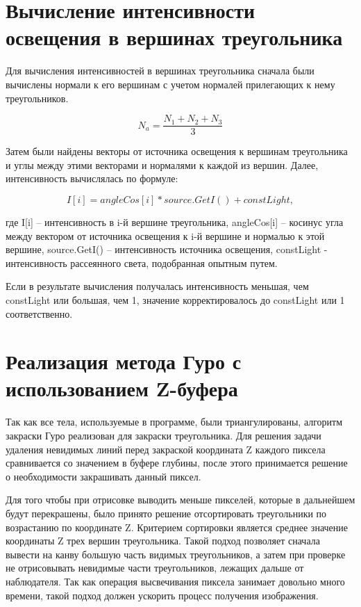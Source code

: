 \section{Вычисление интенсивности освещения в вершинах треугольника}
Для вычисления интенсивностей в вершинах треугольника сначала были вычислены нормали к его вершинам с учетом нормалей прилегающих к нему треугольников.
\begin{figure}[ht!]
\end{figure}

\begin{equation}
	N_a = \frac{N_1 + N_2 + N_3}{3}
\end{equation}

Затем были найдены векторы от источника освещения к вершинам треугольника и углы между этими векторами и нормалями к каждой из вершин. 
Далее, интенсивность вычислялась по формуле:

\begin{equation}
	I[i] = angleCos[i] * source.GetI() + constLight ,
\end{equation}

где I[i] – интенсивность в i-й вершине треугольника, angleCos[i] – косинус угла между вектором от источника освещения к i-й вершине и нормалью к этой вершине, source.GetI() – интенсивность источника освещения, constLight - интенсивность рассеянного света, подобранная опытным путем.

Если в результате вычисления получалась интенсивность меньшая, чем constLight или большая, чем 1, значение корректировалось до constLight или 1 соответственно.




\section{Реализация метода Гуро с использованием Z-буфера}

Так как все тела, используемые в программе, были триангулированы, алгоритм закраски Гуро реализован для закраски треугольника. Для решения задачи удаления невидимых линий перед закраской координата Z каждого пиксела сравнивается со значением в буфере глубины, после этого принимается решение о необходимости закрашивать данный пиксел.

Для того чтобы при отрисовке выводить меньше пикселей, которые в дальнейшем будут перекрашены, было принято решение отсортировать треугольники по возрастанию по координате Z. Критерием сортировки является среднее значение координаты Z трех вершин треугольника. Такой подход позволяет сначала вывести на канву большую часть видимых треугольников, а затем при проверке не отрисовывать невидимые части треугольников, лежащих дальше от наблюдателя. Так как операция высвечивания пиксела занимает довольно много времени, такой подход должен ускорить процесс получения изображения.

